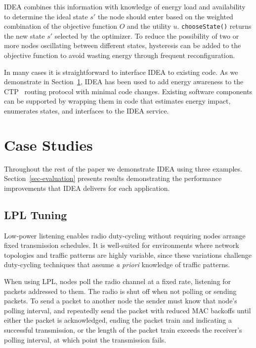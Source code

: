 \documentclass{sig-alternate}
\begin{document}
IDEA combines this information with knowledge of energy load and availability
to determine the ideal state $s'$ the node should enter based on the weighted
combination of the objective function $O$ and the utility $u$.
\texttt{chooseState()} returns the new state $s'$ selected by the optimizer.
To reduce the possibility of two or more nodes oscillating between different
states, hysteresis can be added to the objective function to avoid wasting
energy through frequent reconfiguration.

In many cases it is straightforward to interface IDEA to existing code. As we
demonstrate in Section~\ref{sec-casestudies}, IDEA has been used to add
energy awareness to the CTP~\cite{ctp-sensys09} routing protocol with minimal
code changes. Existing software components can be supported by wrapping them
in code that estimates energy impact, enumerates states, and interfaces to
the IDEA service.

\section{Case Studies}
\label{sec-casestudies}

Throughout the rest of the paper we demonstrate IDEA using three examples.
Section~\ref{sec-evaluation} presents results demonstrating the performance
improvements that IDEA delivers for each application.

\subsection{LPL Tuning}
\label{subsec-lpltuning}

Low-power listening enables radio duty-cycling without requiring nodes
arrange fixed transmission schedules. It is well-suited for environments
where network topologies and traffic patterns are highly variable, since
these variations challenge duty-cycling techniques that assume \textit{a
priori} knowledge of traffic patterns.

When using LPL, nodes poll the radio channel at a fixed rate, listening for
packets addressed to them. The radio is shut off when not polling or sending
packets. To send a packet to another node the sender must know that node's
polling interval, and repeatedly send the packet with reduced MAC backoffs
until either the packet is acknowledged, ending the packet train and
indicating a successful transmission, or the length of the packet train
exceeds the receiver's polling interval, at which point the transmission
fails.
\end{document}
